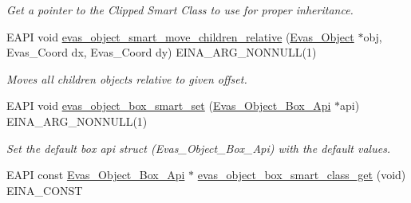 \begin{DoxyCompactItemize}
\begin{DoxyCompactList}\small\item\em Get a pointer to the Clipped Smart Class to use for proper inheritance. \item\end{DoxyCompactList}\item 
EAPI void \hyperlink{group__Evas__Smart__Object__Clipped_ga1e051786da49a712512430fcb6360c12}{evas\_\-object\_\-smart\_\-move\_\-children\_\-relative} (\hyperlink{group__Evas__Object__Group_ga9e19e6dd1f517a0ba437c0114d3e7c97}{Evas\_\-Object} $\ast$obj, Evas\_\-Coord dx, Evas\_\-Coord dy) EINA\_\-ARG\_\-NONNULL(1)
\begin{DoxyCompactList}\small\item\em Moves all children objects relative to given offset. \item\end{DoxyCompactList}\item 
EAPI void \hyperlink{group__Evas__Object__Box_ga19c407e45de527d9400823fb1c85d0fe}{evas\_\-object\_\-box\_\-smart\_\-set} (\hyperlink{struct__Evas__Object__Box__Api}{Evas\_\-Object\_\-Box\_\-Api} $\ast$api) EINA\_\-ARG\_\-NONNULL(1)
\begin{DoxyCompactList}\small\item\em Set the default box {\itshape api\/} struct (Evas\_\-Object\_\-Box\_\-Api) with the default values. \item\end{DoxyCompactList}\item 
EAPI const \hyperlink{struct__Evas__Object__Box__Api}{Evas\_\-Object\_\-Box\_\-Api} $\ast$ \hyperlink{group__Evas__Object__Box_ga58da2c7328e5c8a01a8817f934d083ff}{evas\_\-object\_\-box\_\-smart\_\-class\_\-get} (void) EINA\_\-CONST\label{group__Evas__Object__Box_ga58da2c7328e5c8a01a8817f934d083ff}


\end{DoxyCompactItemize}
